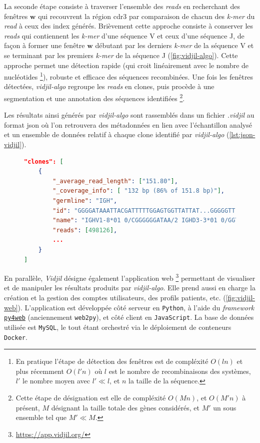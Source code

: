 La seconde étape consiste à traverser l'ensemble des \textit{reads} en recherchant des fenêtres $\mathbf{w}$ qui recouvrent 
la région \gls{cdr}3 par comparaison de chacun des \textit{k-mer} du \textit{read} à ceux des index générés. Brièvement cette 
approche consiste à conserver les \textit{reads} qui contiennent les \textit{k-mer} d'une séquence V et ceux d'une séquence J, 
de façon à former une fenêtre $\mathbf{w}$ débutant par les derniers \textit{k-mer} de la séquence V et se terminant 
par les premiers \textit{k-mer} de la séquence J (\autoref{fig:vidjil-algo}).
Cette approche permet une détection rapide (qui croit linéairement avec le nombre de nucléotides \footnote{En pratique l'étape de détection des fenêtres 
est de compléxité $O(ln)$ et plus récemment $O(l'n)$ où $l$ est le nombre de recombinaisons des systèmes, $l'$ le nombre moyen avec $l' \ll l$, et $n$ 
la taille de la séquence.}), robuste et efficace 
des séquences recombinées. Une fois les fenêtres détectées, \textit{vidjil-algo} regroupe les \textit{reads} en clones, 
puis procède à une segmentation et une annotation des séquences identifiées \footnote{Cette étape de désignation est elle de compléxité $O(Mn)$, et $O(M'n)$ à présent, 
$M$ désignant la taille totale des gènes considérés, et $M'$ un sous ensemble tel que $M' \ll M$.}. 



Les résultats ainsi générés par \textit{vidjil-algo} sont rassemblés dans un fichier \textit{.vidjil} au format \gls{json} où 
l'on retrouvera des métadonnées en lien avec l'échantillon analysé et un ensemble de données relatif à chaque clone 
identifié par \textit{vidjil-algo} (\autoref{lst:json-vidjil}).

\begin{figure}[H]
\begin{lstlisting}[language=json, 
caption={Extrait d'une sortie de \textit{vidjil-algo}.},
label={lst:json-vidjil}]
"clones": [
    {
        "_average_read_length": ["151.80"],
        "_coverage_info": [ "132 bp (86% of 151.8 bp)"],
        "germline": "IGH",
        "id": "GGGGATAAATTACGATTTTTGGAGTGGTTATTAT...GGGGGTT",
        "name": "IGHV1-8*01 0/CGGGGGGATAA/2 IGHD3-3*01 0/GGTATGGGGGGTTTTAG/7 IGHJ4*02",
        "reads": [498126],
        ...
    }
]
\end{lstlisting}
\end{figure}

En parallèle, \textit{Vidjil} désigne également l'application web \footnote{\url{https://app.vidjil.org/}} 
permettant de visualiser et de manipuler les résultats produits par \textit{vidjil-algo}. 
Elle prend aussi en charge la création et la gestion des comptes utilisateurs, des profils patients, etc. (\autoref{fig:vidjil-web}). 
L'application est développée côté serveur en \texttt{Python}, à l'aide du \textit{framework} \href{https://py4web.com}{\texttt{py4web}} 
(anciennement \texttt{web2py}), et côté client en \texttt{JavaScript}. La base de données utilisée est \texttt{MySQL}, 
le tout étant orchestré via le déploiement de conteneurs \texttt{Docker}.

